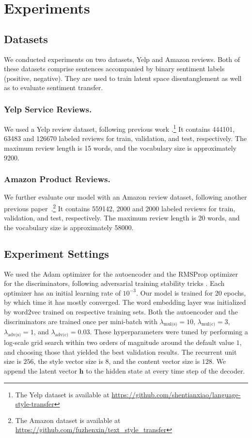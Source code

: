\documentclass[letterpaper]{article} %
\newcommand{\hyp}[1]{\lambda_{\text{#1}}}
\begin{document}
\section{Experiments}

\subsection{Datasets}

We conducted experiments on two datasets, Yelp and Amazon reviews.
Both of these datasets comprise sentences accompanied by binary sentiment labels (positive, negative). They are used to train latent space disentanglement as well as to evaluate sentiment transfer.

\subsubsection{Yelp Service Reviews.}
We used a Yelp review dataset, following previous work \cite{shen2017style,zhao2018adversarially}.\footnote{The Yelp dataset is available at \url{https://github.com/shentianxiao/language-style-transfer}}
It contains 444101, 63483 and 126670 labeled reviews for train, validation, and test, respectively.
The maximum review length is 15 words, and the vocabulary size is approximately 9200.

\subsubsection{Amazon Product Reviews.}
We further evaluate our model with an Amazon review dataset, following another previous paper~\cite{fu2018style}.\footnote{The Amazon dataset is available at \url{https://github.com/fuzhenxin/text_style_transfer}}
It contains 559142, 2000 and 2000 labeled reviews for train, validation, and test, respectively.
The maximum review length is 20 words, and the vocabulary size is approximately 58000.


\subsection{Experiment Settings}
We used the Adam optimizer \cite{kingma2014adam} for the autoencoder and the RMSProp optimizer \cite{tieleman2012lecture} for the discriminators, following adversarial training stability tricks \cite{arjovsky2017wasserstein}.
Each optimizer has an initial learning rate of $10^{-3}$.
Our model is trained for 20 epochs, by which time it has mostly converged.
The word embedding layer was initialized by word2vec \cite{mikolov2013distributed} trained on respective training sets.
Both the autoencoder and the discriminators are trained once per mini-batch with $\hyp{mul(s)} = 10$, $\hyp{mul(c)} = 3$, $\hyp{adv(s)} = 1$, and $\hyp{adv(c)} = 0.03$.
These hyperparameters were tuned by performing a log-scale grid search within two orders of magnitude around the default value $1$, and choosing those that yielded the best validation results.
The recurrent unit size is $256$, the style vector size is $8$, and the content vector size is $128$.
We append the latent vector $\bm h$ to the hidden state at every time step of the decoder.
\end{document}
